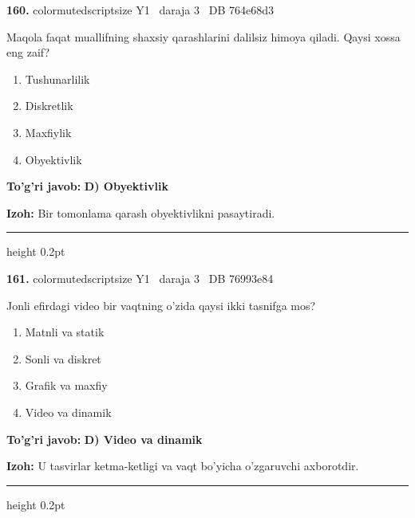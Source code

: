 \documentclass[10pt,a4paper,oneside]{article}
\begin{document}
\noindent\textbf{\color{ink}160.}  {color{muted}scriptsize Y1 \textbullet\ daraja 3 \textbullet\ DB 764e68d3}
\par
Maqola faqat muallifning shaxsiy qarashlarini dalilsiz himoya qiladi. Qaysi xossa eng zaif?
\begin{enumerate}[label=\Alph*),leftmargin=9mm]
\item Tushunarlilik
\item Diskretlik
\item Maxfiylik
\item Obyektivlik
\end{enumerate}
\begin{tcolorbox}[enhanced,breakable,colback=teal!4,colframe=teal!50!black,boxrule=0.5pt,arc=1.1mm,left=3mm,right=3mm,top=1.7mm,bottom=1.7mm,before skip=2mm,after skip=2mm]
\textbf{\color{teal}To'g'ri javob:} \textbf{D) Obyektivlik}
\par\smallskip
\textbf{Izoh:} Bir tomonlama qarash obyektivlikni pasaytiradi.
\end{tcolorbox}
\vspace{2mm}\hrule height 0.2pt \vspace{3mm}

\noindent\textbf{\color{ink}161.}  {color{muted}scriptsize Y1 \textbullet\ daraja 3 \textbullet\ DB 76993e84}
\par
Jonli efirdagi video bir vaqtning o'zida qaysi ikki tasnifga mos?
\begin{enumerate}[label=\Alph*),leftmargin=9mm]
\item Matnli va statik
\item Sonli va diskret
\item Grafik va maxfiy
\item Video va dinamik
\end{enumerate}
\begin{tcolorbox}[enhanced,breakable,colback=teal!4,colframe=teal!50!black,boxrule=0.5pt,arc=1.1mm,left=3mm,right=3mm,top=1.7mm,bottom=1.7mm,before skip=2mm,after skip=2mm]
\textbf{\color{teal}To'g'ri javob:} \textbf{D) Video va dinamik}
\par\smallskip
\textbf{Izoh:} U tasvirlar ketma-ketligi va vaqt bo'yicha o'zgaruvchi axborotdir.
\end{tcolorbox}
\vspace{2mm}\hrule height 0.2pt \vspace{3mm}
\end{document}
